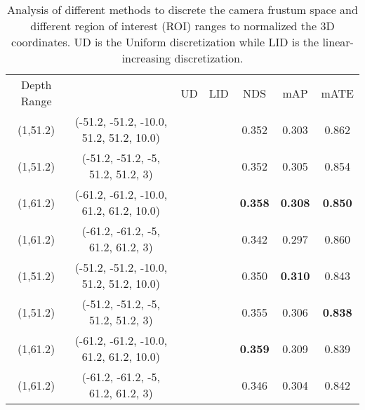 \documentclass[runningheads]{llncs}
\begin{document}
\setlength{\tabcolsep}{2.5pt}
\begin{table}[t!]
\begin{center}
\caption{Analysis of different methods to discrete the camera frustum space and different region of interest (ROI) ranges to normalized the 3D coordinates. UD is the Uniform discretization while LID is the linear-increasing discretization.}
\label{table:lid}
\begin{tabular}{c|c|c|c|ccc}
\hline\noalign{\smallskip}
Depth Range &  & UD & LID  & NDS & mAP & mATE\\
\noalign{\smallskip}
\hline
\noalign{\smallskip}
(1,51.2)&(-51.2, -51.2, -10.0, 51.2, 51.2, 10.0)& &  &0.352 &0.303 &0.862\\
(1,51.2)&(-51.2, -51.2, -5, 51.2, 51.2, 3) & &  &0.352 &0.305 &0.854\\
(1,61.2)&(-61.2, -61.2, -10.0, 61.2, 61.2, 10.0) & & &\textbf{0.358} &\textbf{0.308}  &\textbf{0.850}\\
(1,61.2)&(-61.2, -61.2, -5, 61.2, 61.2, 3) & &  &0.342 &0.297 &0.860\\
\hline
(1,51.2)&(-51.2, -51.2, -10.0, 51.2, 51.2, 10.0)& & &0.350 &\textbf{0.310} &0.843\\
(1,51.2)&(-51.2, -51.2, -5, 51.2, 51.2, 3) & & &0.355 &0.306 &\textbf{0.838}\\
(1,61.2)&(-61.2, -61.2, -10.0, 61.2, 61.2, 10.0) && &\textbf{0.359} & 0.309 &0.839\\
(1,61.2)&(-61.2, -61.2, -5, 61.2, 61.2, 3) & & &0.346 &0.304 &0.842\\
\hline
\end{tabular}
\end{center}
\end{table}
\setlength{\tabcolsep}{1.4pt}
\end{document}
